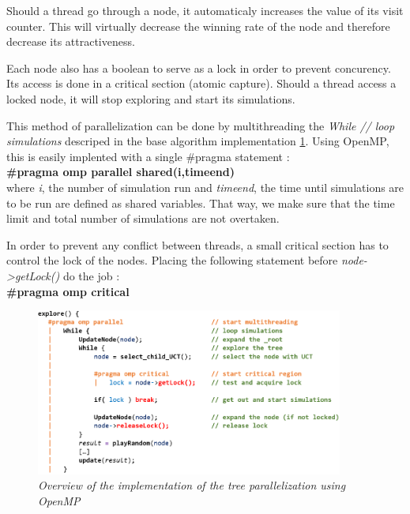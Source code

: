 Should a thread go through a node, it automaticaly increases the value of its visit counter. This will virtually decrease the winning rate of the node and therefore decrease its attractiveness.

Each node also has a boolean to serve as a lock in order to prevent concurency. Its access is done in a critical section (atomic capture). Should a thread access a locked node, it will stop exploring and start its simulations.

This method of parallelization can be done by multithreading the \textit{While // loop simulations} descriped in the base algorithm implementation \ref{fig:MCTSAlgorithmOMP}. Using OpenMP, this is easily implented with a single \#pragma statement :\\
\textbf{\#pragma omp parallel shared(i,timeend)}\\
where \textit{i}, the number of simulation run and \textit{timeend}, the time until simulations are to be run are defined as shared variables. That way, we make sure that the time limit and total number of simulations are not overtaken. 

In order to prevent any conflict between threads, a small critical section has to control the lock of the nodes. Placing the following statement before \textit{node->getLock()} do the job :\\
\textbf{\#pragma omp critical}

\begin{figure}[H]
\centerline{\includegraphics[width=0.9\textwidth]{Parallelisation/Computer/Img/omp.png}}
\caption{\label{fig:MCTSAlgorithmOMP}\textit{Overview of the implementation of the tree parallelization using OpenMP}}
\end{figure}
